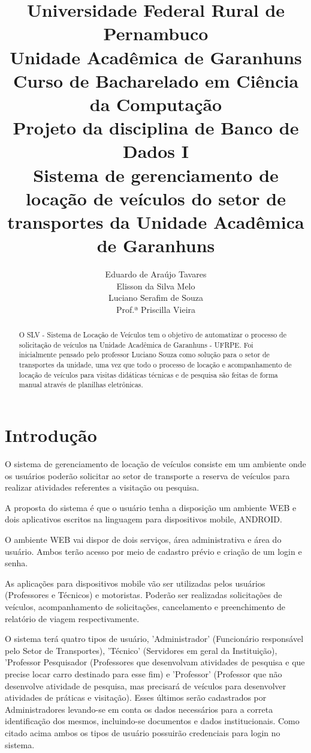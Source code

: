 \documentclass[11pt]{article}
\author{Eduardo de Araújo Tavares\\Elisson da Silva Melo\\Luciano Serafim de Souza\\Prof.ª Priscilla Vieira}
\title{Universidade Federal Rural de Pernambuco\\Unidade Acadêmica de Garanhuns\\Curso de Bacharelado em Ciência da Computação\vspace{5mm}\\ {\large Projeto da disciplina de Banco de Dados I\\Sistema de gerenciamento de locação de veículos do setor de transportes da Unidade Acadêmica de Garanhuns}}
\begin{document}
\frenchspacing

\maketitle

\begin{abstract}
O SLV - Sistema de Locação de Veículos tem o objetivo de automatizar o processo de solicitação de veículos na Unidade Acadêmica de Garanhuns - UFRPE. Foi inicialmente pensado pelo professor Luciano Souza como solução para o setor de transportes da unidade, uma vez que todo o processo de locação e acompanhamento de locação de veículos para visitas didáticas técnicas e de pesquisa são feitas de forma manual através de planilhas eletrônicas. 
\end{abstract}
\section{Introdução}
O sistema de gerenciamento de locação de veículos consiste em um ambiente onde os usuários poderão solicitar ao setor de transporte a reserva de veículos para realizar atividades referentes a visitação ou pesquisa.

A proposta do sistema é que o usuário tenha a disposição um ambiente WEB e dois aplicativos escritos na linguagem para dispositivos mobile, ANDROID.

O ambiente WEB vai dispor de dois serviços, área administrativa e área do usuário. Ambos terão acesso por meio de cadastro prévio e criação de um login e senha. 

As aplicações para dispositivos mobile vão ser utilizadas pelos usuários (Professores e Técnicos) e motoristas. Poderão ser realizadas solicitações de veículos, acompanhamento de solicitações, cancelamento e preenchimento de relatório de viagem respectivamente.

O sistema terá quatro tipos de usuário, 'Administrador' (Funcionário responsável pelo Setor de Transportes), 'Técnico' (Servidores em geral da Instituição), 'Professor Pesquisador (Professores que desenvolvam atividades de pesquisa e que precise locar carro destinado para esse fim) e 'Professor' (Professor que não desenvolve atividade de pesquisa, mas precisará de veículos para desenvolver atividades de práticas e visitação). Esses últimos serão cadastrados por Administradores levando-se em conta os dados necessários para a correta identificação dos mesmos, incluindo-se documentos e dados institucionais. Como citado acima ambos os tipos de usuário possuirão credenciais para login no sistema.
\end{document}
